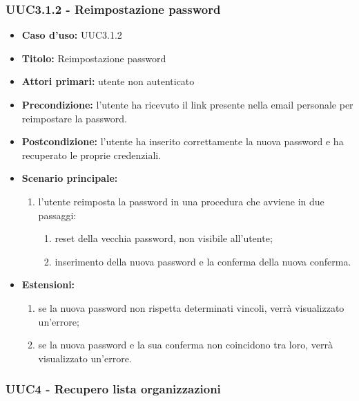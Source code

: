 \documentclass[casi-duso]{subfiles}
\begin{document}
\subsubsection{UUC3.1.2 - Reimpostazione password}%
\label{subsub:UUC3.1.2utente}
\begin{itemize}
  \item \textbf{Caso d’uso:} UUC3.1.2
  \item \textbf{Titolo:} Reimpostazione password
  \item \textbf{Attori primari:} utente non autenticato
  \item \textbf{Precondizione:} l'utente ha ricevuto il link presente nella email personale per reimpostare la password.
  \item \textbf{Postcondizione:} l'utente ha inserito correttamente la nuova password e ha recuperato le proprie credenziali.
  \item \textbf{Scenario principale:}
        \begin{enumerate}
          \item l'utente reimposta la password in una procedura che avviene in due passaggi:
                \begin{enumerate}
                  \item reset della vecchia password, non visibile all'utente;
                  \item inserimento della nuova password e la conferma della nuova conferma.
                \end{enumerate}
        \end{enumerate}
  \item \textbf{Estensioni:}
        \begin{enumerate}
          \item se la nuova password non rispetta determinati vincoli, verrà visualizzato un'errore;
          \item se la nuova password e la sua conferma non coincidono tra loro, verrà visualizzato un'errore.
        \end{enumerate}
\end{itemize}

\subsubsection{UUC4 - Recupero lista organizzazioni}%
\label{subsub:UUC4utente}
\end{document}

